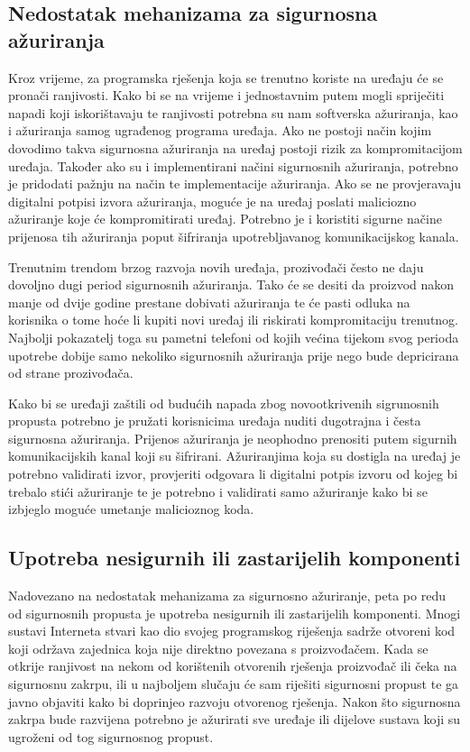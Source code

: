 \documentclass[times, utf8, diplomski]{fer}
\begin{document}
\subsection{Nedostatak mehanizama za sigurnosna ažuriranja}
Kroz vrijeme, za programska rješenja koja se trenutno koriste na uređaju će se pronači ranjivosti. Kako bi se na vrijeme i jednostavnim putem mogli spriječiti napadi koji iskorištavaju te ranjivosti potrebna su nam softverska ažuriranja, kao i ažuriranja samog ugrađenog programa  uređaja. Ako ne postoji način kojim dovodimo takva sigurnosna ažuriranja na uređaj postoji rizik za kompromitacijom uređaja. Također ako su i implementirani načini sigurnosnih ažuriranja, potrebno je pridodati pažnju na način te implementacije ažuriranja. Ako se ne provjeravaju digitalni potpisi izvora ažuriranja, moguće je na uređaj poslati maliciozno ažuriranje koje će kompromitirati uređaj. Potrebno je i koristiti sigurne načine prijenosa tih ažuriranja poput šifriranja upotrebljavanog komunikacijskog kanala. 

Trenutnim trendom brzog razvoja novih uređaja, prozivođači često ne daju dovoljno dugi period sigurnosnih ažuriranja. Tako će se desiti da proizvod nakon manje od dvije godine prestane dobivati ažuriranja te će pasti odluka na korisnika o tome hoće li kupiti novi uređaj ili riskirati kompromitaciju trenutnog. Najbolji pokazatelj toga su pametni telefoni od kojih većina tijekom svog perioda upotrebe dobije samo nekoliko sigurnosnih ažuriranja prije nego bude depricirana od strane prozivođača.

Kako bi se uređaji zaštili od budućih napada zbog novootkrivenih sigrunosnih propusta potrebno je pružati korisnicima uređaja nuditi dugotrajna i česta sigurnosna ažuriranja. Prijenos ažuriranja je neophodno prenositi putem sigurnih komunikacijskih kanal koji su šifrirani. Ažuriranjima koja su dostigla na uređaj je potrebno validirati izvor, provjeriti odgovara li digitalni potpis izvoru od kojeg bi trebalo stići ažuriranje te je potrebno i validirati samo ažuriranje kako bi se izbjeglo moguće umetanje malicioznog koda.

\subsection{Upotreba nesigurnih ili zastarijelih komponenti}
Nadovezano na nedostatak mehanizama za sigurnosno ažuriranje, peta po redu od sigurnosnih propusta je upotreba nesigurnih ili zastarijelih komponenti. Mnogi sustavi Interneta stvari kao dio svojeg programskog riješenja sadrže otvoreni kod koji održava zajednica koja nije direktno povezana s proizvođačem. Kada se otkrije ranjivost na nekom od korištenih otvorenih rješenja proizvođač ili čeka na sigurnosnu zakrpu, ili u najboljem slučaju će sam riješiti sigurnosni propust te ga javno objaviti kako bi doprinjeo razvoju otvorenog rješenja. Nakon što sigurnosna zakrpa bude razvijena potrebno je ažurirati sve uređaje ili dijelove sustava koji su ugroženi od tog sigurnosnog propust. 
\end{document}
